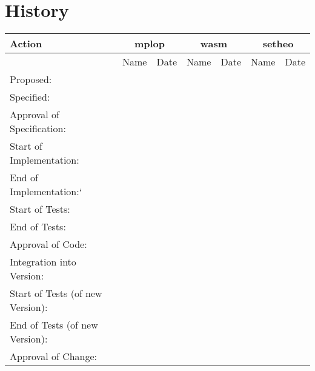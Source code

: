 \section{History}

\begin{center}
\begin{tabular}{|l||c|c||c|c||c|c||}
\hline\hline
Action & \multicolumn{2}{|c|}{mplop} &
\multicolumn{2}{|c|}{wasm} & \multicolumn{2}{|c|}{setheo}  \\
\hline
& Name & Date & Name & Date & Name & Date \\
\hline\hline
 Proposed:& & & & & & \\
 Specified:& & & & & & \\
 Approval of Specification:& & & & & & \\
 Start of Implementation:& & & & & & \\
 End of Implementation:`& & & & & & \\
 Start of Tests:& & & & & & \\
 End of Tests:& & & & & & \\
 Approval of Code:& & & & & & \\
 Integration into Version: & & & & & & \\
 Start of Tests (of new Version):& & & & & & \\
 End of Tests (of new Version):& & & & & & \\
 Approval of Change:& & & & & & \\
\hline\hline
\end{tabular}
\end{center}


